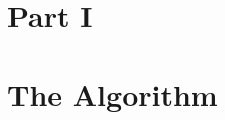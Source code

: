 \documentclass{beamer}
\begin{document}
\section{Part I}
% 
% 



\section{The Algorithm}
\end{document}
